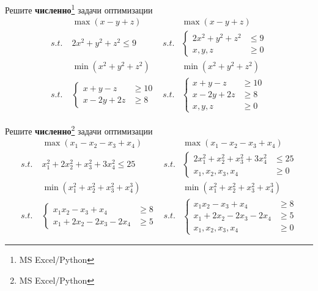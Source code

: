 \begin{exercise}
Решите \textbf{численно}\footnote{MS Excel/Python} задачи оптимизации
\begin{align*}
	&\max (x-y+z) & &\max (x-y+z) \\
	s.t.\;& 2x^2+y^2+z^2\leq 9 &
	s.t.&\left\{\begin{aligned}
		2x^2+y^2+z^2 &\leq 9 \\ x,y,z&\geq 0 
	\end{aligned}\right. \\
	&\min (x^2+y^2+z^2) & &\min(x^2+y^2+z^2) \\
	s.t.&\left\{\begin{aligned}
		x+y-z &\geq 10 \\ x-2y+2z&\geq 8 
	\end{aligned}\right. &
	s.t.&\left\{\begin{aligned}
		x+y-z &\geq 10 \\ x-2y+2z&\geq 8 \\ x,y,z &\geq0 
	\end{aligned}\right.
\end{align*}
\end{exercise}

\begin{exercise}
Решите \textbf{численно}\footnote{MS Excel/Python} задачи оптимизации
\begin{align*}
	&\max (x_1-x_2-x_3+x_4) & &\max (x_1-x_2-x_3+x_4) \\
	s.t.\;& x_1^2+2x_2^2+x_3^2+3x_4^2\leq 25 &
	s.t.&\left\{\begin{aligned}
		2x_1^2+x_2^2+x_3^2+3x_4^2 &\leq 25 \\ x_1,x_2,x_3,x_4&\geq 0 
	\end{aligned}\right. \\
	&\min (x_1^2+x_2^2+x_3^2+x_4^3) & &\min(x_1^2+x_2^2+x_3^2+x_4^3) \\
	s.t.&\left\{\begin{aligned}
		x_1x_2-x_3+x_4 &\geq 8 \\ x_1+2x_2-2x_3-2x_4&\geq 5 
	\end{aligned}\right. &
	s.t.&\left\{\begin{aligned}
		x_1x_2-x_3+x_4 &\geq 8 \\ x_1+2x_2-2x_3-2x_4&\geq 5 \\ 
		x_1,x_2,x_3,x_4 &\geq0 
	\end{aligned}\right.
\end{align*}
\end{exercise}

